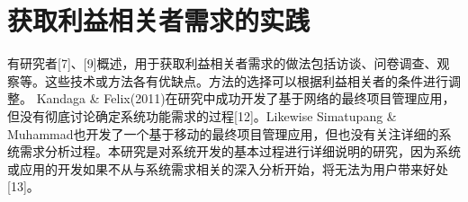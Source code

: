 \section{获取利益相关者需求的实践}

有研究者[7]、[9]概述，用于获取利益相关者需求的做法包括访谈、问卷调查、观察等。这些技术或方法各有优缺点。方法的选择可以根据利益相关者的条件进行调整。
Kandaga \& Felix(2011)在研究中成功开发了基于网络的最终项目管理应用，但没有彻底讨论确定系统功能需求的过程[12]。Likewise Simatupang \& Muhammad也开发了一个基于移动的最终项目管理应用，但也没有关注详细的系统需求分析过程。本研究是对系统开发的基本过程进行详细说明的研究，因为系统或应用的开发如果不从与系统需求相关的深入分析开始，将无法为用户带来好处[13]。
